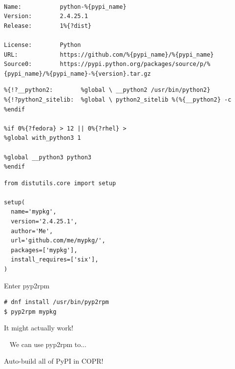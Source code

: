 \documentclass[1610,20pt]{beamer}
\newcommand\sk{\par\bigskip\bigskip\par}
\begin{document}
\begin{center}
\begin{frame}[fragile]
    \begin{lstlisting}[frame=single]
%global pypi_name mypkg

Name:           python-%{pypi_name}
Version:        2.4.25.1
Release:        1%{?dist}

License:        Python
URL:            https://github.com/%{pypi_name}/%{pypi_name}
Source0:        https://pypi.python.org/packages/source/p/%{pypi_name}/%{pypi_name}-%{version}.tar.gz
    \end{lstlisting}
    \sk\sk
\end{frame}
 
\begin{frame}[fragile]
    \begin{lstlisting}[frame=single]
%if 0%{?rhel} && 0%{?rhel} <= 6
%{!?__python2:        %global \ __python2 /usr/bin/python2}
%{!?python2_sitelib:  %global \ python2_sitelib %(%{__python2} -c 
%endif

%if 0%{?fedora} > 12 || 0%{?rhel} >
%global with_python3 1

%global __python3 python3
%endif
    \end{lstlisting}
    \sk\sk
\end{frame}

\begin{frame}[fragile]
    \begin{lstlisting}[frame=single]
from distutils.core import setup

setup(
  name='mypkg',
  version='2.4.25.1',
  author='Me',
  url='github.com/me/mypkg/',
  packages=['mypkg'],
  install_requires=['six'],
)
    \end{lstlisting}
    \sk\sk
\end{frame}

\begin{frame}[fragile]
    Enter pyp2rpm

    \begin{lstlisting}[frame=single]
# dnf install /usr/bin/pyp2rpm
$ pyp2rpm mypkg
    \end{lstlisting}

    \sk\pause
    \color{mutegray}
    It might actually work!
\end{frame}

\begin{frame}[fragile]
    ~{\color{mutegray} We can use pyp2rpm to...}

    \sk

    Auto-build all of PyPI in COPR!


\end{frame}
\end{center}
\end{document}
